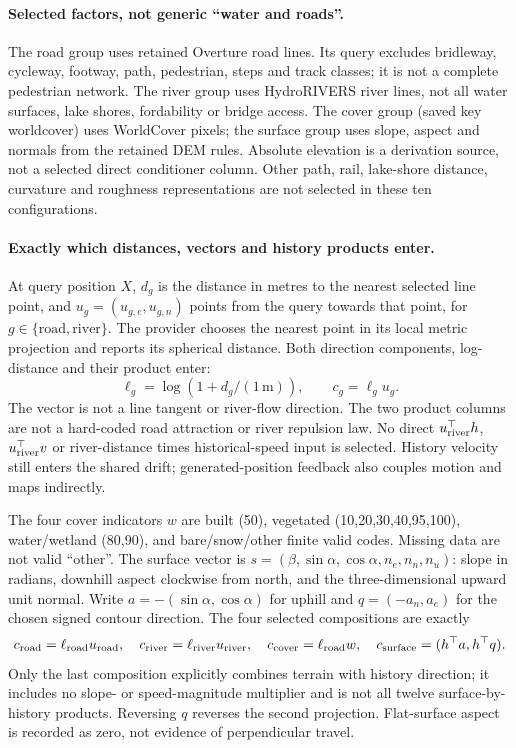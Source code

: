\paragraph{Selected factors, not generic ``water and roads''.}
The road group uses retained Overture road lines. Its query excludes
bridleway, cycleway, footway, path, pedestrian, steps and track classes;
it is not a complete pedestrian network. The river group uses HydroRIVERS
river lines, not all water surfaces, lake shores, fordability or bridge access.
The cover group (saved key worldcover) uses WorldCover pixels; the surface
group uses slope, aspect and normals from the retained DEM rules. Absolute
elevation is a derivation source, not a selected direct conditioner column.
Other path, rail, lake-shore distance, curvature and roughness representations
are not selected in these ten configurations.

\paragraph{Exactly which distances, vectors and history products enter.}
At query position $X$, $d_g$ is the distance in metres to the nearest selected
line point, and $u_g=(u_{g,e},u_{g,n})$ points from the query towards that
point, for $g\in\{\mathrm{road},\mathrm{river}\}$. The provider chooses the
nearest point in its local metric projection and reports its spherical
distance. Both direction components, log-distance and their product enter:
\begin{equation}\label{eq:main-map-distance}
 \ell_g=\log(1+d_g/(1\,\mathrm m)),\qquad c_g=\ell_g u_g .
\end{equation}
The vector is not a line tangent or river-flow direction. The two product
columns are not a hard-coded road attraction or river repulsion law.
No direct $u_{\rm river}^{\top}h$, $u_{\rm river}^{\top}v$ or river-distance
times historical-speed input is selected. History velocity still enters
the shared drift; generated-position feedback also couples motion and maps
indirectly.

The four cover indicators $w$ are built (50), vegetated (10,20,30,40,95,100),
water/wetland (80,90), and bare/snow/other finite valid codes. Missing data
are not valid ``other''. The surface vector is
$s=(\beta,\sin\alpha,\cos\alpha,n_e,n_n,n_u)$: slope in radians, downhill
aspect clockwise from north, and the three-dimensional upward unit normal.
Write $a=-(\sin\alpha,\cos\alpha)$ for uphill and $q=(-a_n,a_e)$ for the
chosen signed contour direction. The four selected compositions are exactly
\begin{equation}\label{eq:main-map-compositions}
 c_{\rm road}=\ell_{\rm road}u_{\rm road},\quad
 c_{\rm river}=\ell_{\rm river}u_{\rm river},\quad
 c_{\rm cover}=\ell_{\rm road}w,\quad
 c_{\rm surface}=(h^\top a,h^\top q).
\end{equation}
Only the last composition explicitly combines terrain with history direction;
it includes no slope- or speed-magnitude multiplier and is not all twelve
surface-by-history products. Reversing $q$ reverses the second projection.
Flat-surface aspect is recorded as zero, not evidence of perpendicular travel.

